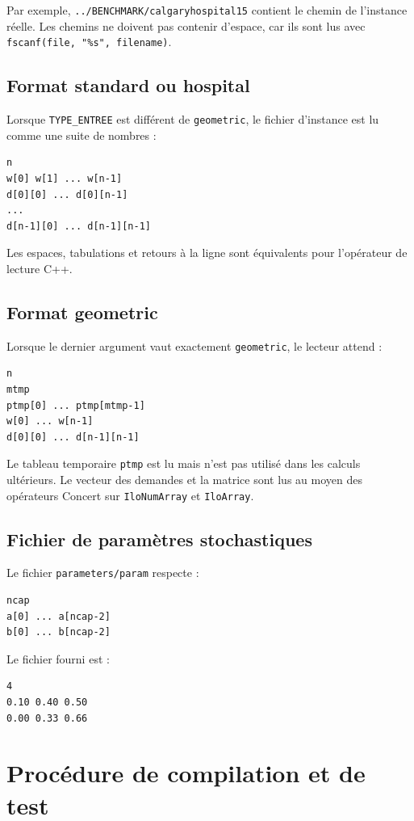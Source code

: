 \documentclass[11pt,a4paper]{article}
\newcommand{\code}[1]{\texttt{#1}}
\begin{document}
Par exemple, \code{../BENCHMARK/calgaryhospital15} contient le chemin de
l'instance réelle. Les chemins ne doivent pas contenir d'espace, car ils sont
lus avec \code{fscanf(file, "\%s", filename)}.

\subsection{Format standard ou hospital}

Lorsque \code{TYPE\_ENTREE} est différent de \code{geometric}, le fichier
d'instance est lu comme une suite de nombres :
\begin{lstlisting}
n
w[0] w[1] ... w[n-1]
d[0][0] ... d[0][n-1]
...
d[n-1][0] ... d[n-1][n-1]
\end{lstlisting}

Les espaces, tabulations et retours à la ligne sont équivalents pour
l'opérateur de lecture C++.

\subsection{Format geometric}

Lorsque le dernier argument vaut exactement \code{geometric}, le lecteur
attend :
\begin{lstlisting}
n
mtmp
ptmp[0] ... ptmp[mtmp-1]
w[0] ... w[n-1]
d[0][0] ... d[n-1][n-1]
\end{lstlisting}

Le tableau temporaire \code{ptmp} est lu mais n'est pas utilisé dans les
calculs ultérieurs. Le vecteur des demandes et la matrice sont lus au moyen
des opérateurs Concert sur \code{IloNumArray} et \code{IloArray}.

\subsection{Fichier de paramètres stochastiques}

Le fichier \code{parameters/param} respecte :
\begin{lstlisting}
ncap
a[0] ... a[ncap-2]
b[0] ... b[ncap-2]
\end{lstlisting}

Le fichier fourni est :
\begin{lstlisting}
4
0.10 0.40 0.50
0.00 0.33 0.66
\end{lstlisting}

\section{Procédure de compilation et de test}
\end{document}
